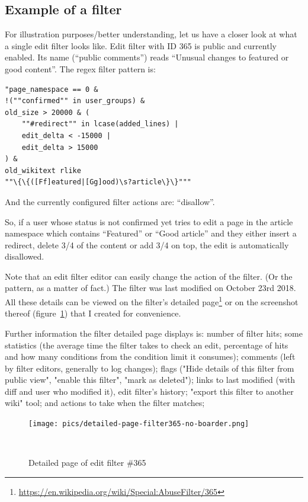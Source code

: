 \subsection{Example of a filter}

For illustration purposes/better understanding, let us have a closer look at what a single edit filter looks like.
Edit filter with ID 365 is public and currently enabled.
Its name (``public comments'') reads ``Unusual changes to featured or good content''.
The regex filter pattern is:
\begin{verbatim}
"page_namespace == 0 &
!(""confirmed"" in user_groups) &
old_size > 20000 & (
    ""#redirect"" in lcase(added_lines) |
    edit_delta < -15000 |
    edit_delta > 15000
) &
old_wikitext rlike
""\{\{([Ff]eatured|[Gg]ood)\s?article\}\}"""
\end{verbatim}
And the currently configured filter actions are: ``disallow''.

So, if a user whose status is not confirmed yet tries to edit a page in the article namespace which contains ``Featured'' or ``Good article'' and they either insert a redirect, delete 3/4 of the content or add 3/4 on top, the edit is automatically disallowed.

Note that an edit filter editor can easily change the action of the filter. (Or the pattern, as a matter of fact.)
The filter was last modified on October 23rd 2018.
All these details can be viewed on the filter's detailed page\footnote{\url{https://en.wikipedia.org/wiki/Special:AbuseFilter/365}}
or on the screenshot thereof (figure~\ref{fig:filter-details}) that I created for convenience.

Further information the filter detailed page displays is:
number of filter hits; some statistics (the average time the filter takes to check an edit, percentage of hits and how many conditions from the condition limit it consumes); comments (left by filter editors, generally to log changes); flags ("Hide details of this filter from public view", "enable this filter", "mark as deleted");
links to last modified (with diff and user who modified it), edit filter's history; "export this filter to another wiki" tool;
and actions to take when the filter matches;

\begin{figure}
\centering
  \texttt{[image: pics/detailed-page-filter365-no-boarder.png]}
  \caption{Detailed page of edit filter \#365}~\label{fig:filter-details}
\end{figure}

